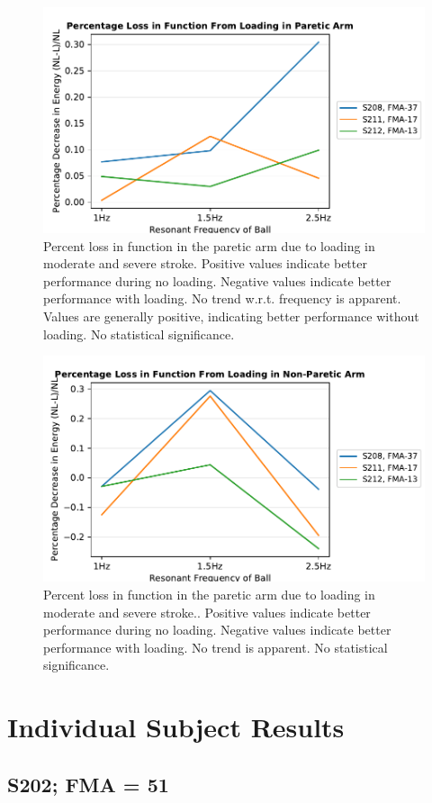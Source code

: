\documentclass{article}
\begin{document}
\begin{figure}[!ht]
     \centering
     \includegraphics[width=0.5\linewidth]{Plots/pl_A0_modsevere.pdf}
	\caption{Percent loss in function in the paretic arm due to loading in moderate and severe stroke. Positive values indicate better performance during no loading. Negative values indicate better performance with loading. No trend w.r.t. frequency is apparent. Values are generally positive, indicating better performance without loading. No statistical significance.}
\end{figure}


\begin{figure}[!ht]
     \centering
     \includegraphics[width=0.5\linewidth]{Plots/pl_A1_modsevere.pdf}
	\caption{Percent loss in function in the paretic arm due to loading in moderate and severe stroke.. Positive values indicate better performance during no loading. Negative values indicate better performance with loading. No trend is apparent. No statistical significance.}
\end{figure}


\clearpage
\section{Individual Subject Results}

\subsection{S202; FMA = 51}
\end{document}
